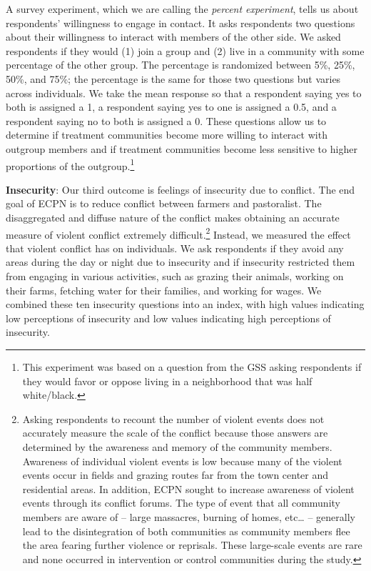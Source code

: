 \documentclass[11pt]{article}
\begin{document}
A survey experiment, which we are calling the \emph{percent experiment},
tells us about respondents' willingness to engage in contact. It asks
respondents two questions about their willingness to interact with
members of the other side. We asked respondents if they would (1) join a
group and (2) live in a community with some percentage of the other
group. The percentage is randomized between 5\%, 25\%, 50\%, and 75\%;
the percentage is the same for those two questions but varies across
individuals. We take the mean response so that a respondent saying yes
to both is assigned a 1, a respondent saying yes to one is assigned a
0.5, and a respondent saying no to both is assigned a 0. These questions
allow us to determine if treatment communities become more willing to
interact with outgroup members and if treatment communities become less
sensitive to higher proportions of the outgroup.\footnote{This
  experiment was based on a question from the GSS asking respondents if
  they would favor or oppose living in a neighborhood that was half
  white/black.}

\textbf{Insecurity}: Our third outcome is feelings of insecurity due to
conflict. The end goal of ECPN is to reduce conflict between farmers and
pastoralist. The disaggregated and diffuse nature of the conflict makes
obtaining an accurate measure of violent conflict extremely
difficult.\footnote{Asking respondents to recount the number of violent
  events does not accurately measure the scale of the conflict because
  those answers are determined by the awareness and memory of the
  community members. Awareness of individual violent events is low
  because many of the violent events occur in fields and grazing routes
  far from the town center and residential areas. In addition, ECPN
  sought to increase awareness of violent events through its conflict
  forums. The type of event that all community members are aware of --
  large massacres, burning of homes, etc\ldots{} -- generally lead to
  the disintegration of both communities as community members flee the
  area fearing further violence or reprisals. These large-scale events
  are rare and none occurred in intervention or control communities
  during the study.} Instead, we measured the effect that violent
conflict has on individuals. We ask respondents if they avoid any areas
during the day or night due to insecurity and if insecurity restricted
them from engaging in various activities, such as grazing their animals,
working on their farms, fetching water for their families, and working
for wages. We combined these ten insecurity questions into an index,
with high values indicating low perceptions of insecurity and low values
indicating high perceptions of insecurity.
\end{document}
